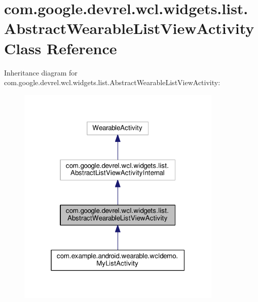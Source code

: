 \hypertarget{classcom_1_1google_1_1devrel_1_1wcl_1_1widgets_1_1list_1_1AbstractWearableListViewActivity}{}\section{com.\+google.\+devrel.\+wcl.\+widgets.\+list.\+Abstract\+Wearable\+List\+View\+Activity Class Reference}
\label{classcom_1_1google_1_1devrel_1_1wcl_1_1widgets_1_1list_1_1AbstractWearableListViewActivity}


Inheritance diagram for com.\+google.\+devrel.\+wcl.\+widgets.\+list.\+Abstract\+Wearable\+List\+View\+Activity\+:
\nopagebreak
\begin{figure}[H]
\begin{center}
\leavevmode
\includegraphics[width=277pt]{dd/d7c/classcom_1_1google_1_1devrel_1_1wcl_1_1widgets_1_1list_1_1AbstractWearableListViewActivity__inherit__graph}
\end{center}
\end{figure}


